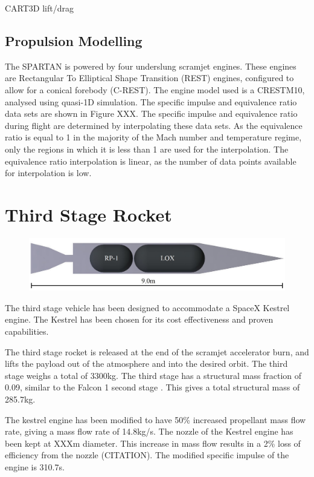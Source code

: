 CART3D lift/drag 

		
		\subsection{Propulsion Modelling}
		
		The SPARTAN is powered by four underslung scramjet engines. These engines are Rectangular To Elliptical Shape Transition (REST) engines, configured to allow for a conical forebody (C-REST). The engine model used is a CRESTM10, analysed using quasi-1D simulation. The specific impulse and equivalence ratio data sets are shown in Figure XXX. The specific impulse and equivalence ratio during flight are determined by interpolating these data sets. 
		As the equivalence ratio is equal to 1 in the majority of the Mach number and temperature regime, only the regions in which it is less than 1 are used for the interpolation. The equivalence ratio interpolation is linear, as the number of data points available for interpolation is low. 
	
	
	\section{Third Stage Rocket}
	
	\begin{figure}
\centering
\includegraphics[width=0.7\linewidth]{figures/3_vehicle_design/3rdStage}
\caption{}
\label{fig:3rdStage}
\end{figure}

	The third stage vehicle has been designed to accommodate a SpaceX Kestrel engine. The Kestrel has been chosen for its cost effectiveness and proven capabilities. 
	
	The third stage rocket is released at the end of the scramjet accelerator burn, and lifts the payload out of the atmosphere and into the desired orbit. The third stage weighs a total of 3300kg. The third stage has a structural mass fraction of 0.09, similar to the Falcon 1 second stage \cite{Vehicle2008}. This gives a total structural mass of 285.7kg. 
	
	

	
The kestrel engine has been modified to have 50\% increased propellant mass flow rate, giving a mass flow rate of 14.8kg/s. The nozzle of the Kestrel engine has been kept at XXXm diameter. This increase in mass flow results in a 2\% loss of efficiency from the nozzle (CITATION). The modified specific impulse of the engine is 310.7s.

